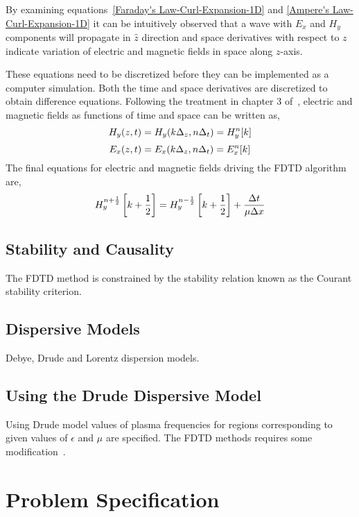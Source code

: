 \documentclass{report}
\begin{document}
By examining equations~\ref{Faraday's Law-Curl-Expansion-1D} and \ref{Ampere's Law-Curl-Expansion-1D} it can be intuitively observed that a wave with $E_x$ and $H_y$ components will propagate in $\hat{z}$ direction and space derivatives with respect to $z$ indicate variation of electric and magnetic fields in space along $z$-axis.

These equations need to be discretized before they can be implemented as a computer simulation. Both the time and space derivatives are discretized to obtain difference equations. Following the treatment in chapter 3 of~\cite{JBSchneiderUFDTD}, electric and magnetic fields as functions of time and space can be written as,
\begin{equation}
\centering
H_y (z,t)=H_y (k\Delta _z,n\Delta _t)=H^n_y[k]
\label{Hy-of-z_and_t}
\end{equation}
\begin{equation}
\centering
E_x (z,t)=E_x (k\Delta _z,n\Delta _t)=E^n_x[k]
\label{Ex-of-z_and_t}
\end{equation}
The final equations for electric and magnetic fields driving the FDTD algorithm are,
\begin{equation}
\centering
H^{n+\frac{1}{2}}_y \left[k+\frac{1}{2}\right]=H^{n-\frac{1}{2}}_y \left[k+\frac{1}{2}\right] + \dfrac{\Delta t}{\mu \Delta x}
\label{Hy-1D-Simple-FDTD-Driver}
\end{equation}


\section{Stability and Causality}

The FDTD method is constrained by the stability relation known as the Courant stability criterion.

\section{Dispersive Models}
Debye, Drude and Lorentz dispersion models.

\section{Using the Drude Dispersive Model}
Using Drude model values of plasma frequencies for regions corresponding to given values of $\epsilon$ and $\mu$ are specified. The FDTD methods requires some modification~\cite{Radial-Zhao}.

\chapter{Problem Specification}
\end{document}
